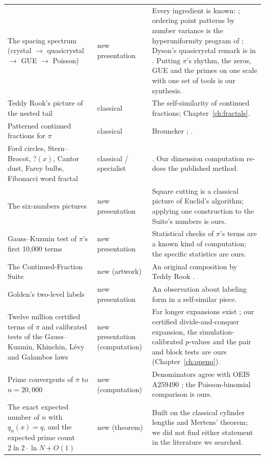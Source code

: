 \begin{longtable}{p{}p{}p{}}
The spacing spectrum (crystal $\to$ quasicrystal $\to$ GUE $\to$ Poisson) & new presentation & Every ingredient is known: \citet{Montgomery1973,Dyson1962,Odlyzko1987,Mehta2004,Berry1988,Bogomolny2006}; ordering point patterns by number variance is the hyperuniformity program of \citet{TorquatoStillinger2003}; Dyson's quasicrystal remark is in \citet{Dyson2009}. Putting $\pi$'s rhythm, the zeros, GUE and the primes on one scale with one set of tools is our synthesis. \\
Teddy Rook's picture of the nested tail & classical & The self-similarity of continued fractions; Chapter~\ref{ch:fractals}. \\
Patterned continued fractions for $\pi$ & classical & Brouncker \citep{Khrushchev2006}; \citet{Lange1999}. \\
Ford circles, Stern--Brocot, ?$(x)$, Cantor dust, Farey bulbs, Fibonacci word fractal & classical / specialist & \citet{Ford1938,Stern1858,Brocot1861,Minkowski1904,Denjoy1938,Salem1943,Good1941,JenkinsonPollicott2001,JenkinsonPollicott2018,Devaney1999,MonnerotDumaine2009}. Our dimension computation re-does the published method. \\
The six-numbers pictures & new presentation & Square cutting is a classical picture of Euclid's algorithm; applying one construction to the Suite's numbers is ours. \\
Gauss--Kuzmin test of $\pi$'s first 10,000 terms & new presentation & Statistical checks of $\pi$'s terms are a known kind of computation; the specific statistics are ours. \\
The Continued-Fraction Suite & new (artwork) & An original composition by Teddy Rook \citep{SuiteScore}. \\
Golden's two-level labels & new presentation & An observation about labeling form in a self-similar piece. \\
Twelve million certified terms of $\pi$ and calibrated tests of the Gauss--Kuzmin, Khinchin, Lévy and Galambos laws \addedon{\revA} & new presentation (computation) & Far longer expansions exist \citep{MathWorldPiCF,OEIS_A001203}; our certified divide-and-conquer expansion, the simulation-calibrated $p$-values and the pair and block tests are ours (Chapter~\ref{ch:openq}). \\
Prime convergents of $\pi$ to $n = 20{,}000$ \addedon{\revA} & new (computation) & Denominators agree with OEIS A259490 \citep{OEIS_A259490}; the Poisson-binomial comparison is ours. \\
The exact expected number of $n$ with $q_n(x) = q$, and the expected prime count $2\ln 2\cdot\ln N + O(1)$ \addedon{\revA} & new (theorem) & Built on the classical cylinder lengths \citep{Khinchin1964} and Mertens' theorem; we did not find either statement in the literature we searched. \\

\end{longtable}
